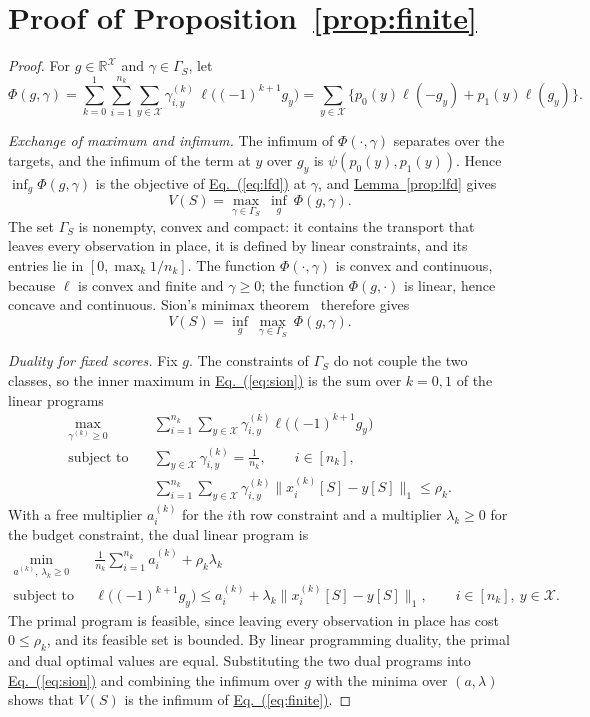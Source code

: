 \documentclass[11pt,a4paper]{article}
\newcommand{\Eqref}[1]{\hyperref[#1]{Eq.~(\ref*{#1})}}
\newcommand{\Lemref}[1]{\hyperref[#1]{Lemma~\ref*{#1}}}
\theoremstyle{plain}
\begin{document}
\section{Proof of Proposition~\ref{prop:finite}}\label{app:finite}
\begin{proof}
For $g\in\mathbb R^{\mathcal X}$ and $\gamma\in\Gamma_S$, let
\[
\Phi(g,\gamma)=\sum_{k=0}^1\sum_{i=1}^{n_k}\sum_{y\in\mathcal X}
\gamma_{i,y}^{(k)}\,\ell\bigl((-1)^{k+1}g_y\bigr)
=\sum_{y\in\mathcal X}\bigl\{p_0(y)\ell(-g_y)+p_1(y)\ell(g_y)\bigr\}.
\]

\emph{Exchange of maximum and infimum.}
The infimum of $\Phi(\cdot,\gamma)$ separates over the targets, and the
infimum of the term at $y$ over $g_y$ is $\psi(p_0(y),p_1(y))$. Hence
$\inf_g\Phi(g,\gamma)$ is the objective of \Eqref{eq:lfd} at $\gamma$, and
\Lemref{prop:lfd} gives
\[
V(S)=\max_{\gamma\in\Gamma_S}\ \inf_{g}\ \Phi(g,\gamma).
\]
The set $\Gamma_S$ is nonempty, convex and compact: it contains the
transport that leaves every observation in place, it is defined by
linear constraints, and its entries lie in $[0,\max_k1/n_k]$. The
function $\Phi(\cdot,\gamma)$ is convex and continuous, because $\ell$
is convex and finite and $\gamma\ge0$; the function $\Phi(g,\cdot)$ is
linear, hence concave and continuous.
Sion's minimax theorem~\cite{sion1958minimax} therefore gives
\begin{equation}\label{eq:sion}
V(S)=\inf_{g}\ \max_{\gamma\in\Gamma_S}\ \Phi(g,\gamma).
\end{equation}

\emph{Duality for fixed scores.}
Fix $g$. The constraints of $\Gamma_S$ do not couple the two classes,
so the inner maximum in \Eqref{eq:sion} is the sum over $k=0,1$ of the
linear programs
\[
\begin{aligned}
\max_{\gamma^{(k)}\ge0}\quad&\sum_{i=1}^{n_k}\sum_{y\in\mathcal X}
\gamma_{i,y}^{(k)}\ell\bigl((-1)^{k+1}g_y\bigr)\\
\text{subject to}\quad&
\sum_{y\in\mathcal X}\gamma_{i,y}^{(k)}=\frac1{n_k},
\qquad i\in[n_k],\\
&\sum_{i=1}^{n_k}\sum_{y\in\mathcal X}\gamma_{i,y}^{(k)}
\|x_i^{(k)}[S]-y[S]\|_1\le\rho_k.
\end{aligned}
\]
With a free multiplier $a_i^{(k)}$ for the $i$th row constraint and a
multiplier $\lambda_k\ge0$ for the budget constraint, the dual linear
program is
\[
\begin{aligned}
\min_{a^{(k)},\,\lambda_k\ge0}\quad&
\frac1{n_k}\sum_{i=1}^{n_k}a_i^{(k)}+\rho_k\lambda_k\\
\text{subject to}\quad&
\ell\bigl((-1)^{k+1}g_y\bigr)\le a_i^{(k)}
+\lambda_k\|x_i^{(k)}[S]-y[S]\|_1,
\qquad i\in[n_k],\ y\in\mathcal X.
\end{aligned}
\]
The primal program is feasible, since leaving every observation in
place has cost $0\le\rho_k$, and its feasible set is bounded. By linear
programming duality, the primal and dual optimal values are equal.
Substituting the two dual programs into \Eqref{eq:sion} and combining
the infimum over $g$ with the minima over $(a,\lambda)$ shows that
$V(S)$ is the infimum of \Eqref{eq:finite}.


\end{proof}
\end{document}
